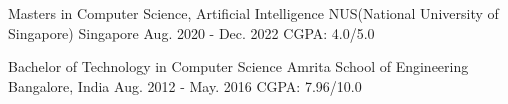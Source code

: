 

\begin{cventries}

  \cventry
    {Masters in Computer Science, Artificial Intelligence} %
    {NUS(National University of Singapore)} %
    {Singapore} %
    {Aug. 2020 - Dec. 2022} %
    {CGPA: 4.0/5.0}

  \cventry
    {Bachelor of Technology in  Computer Science} %
    {Amrita School of Engineering} %
    {Bangalore, India} %
    {Aug. 2012 - May. 2016} %
    {CGPA: 7.96/10.0}
  

\end{cventries}
